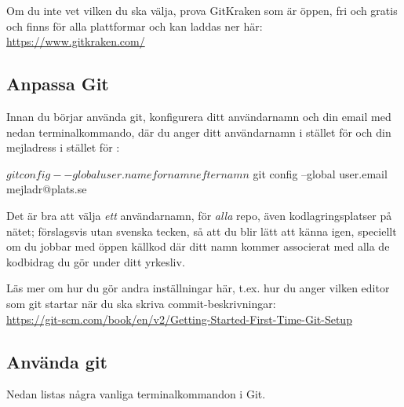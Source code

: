 Om du inte vet vilken du ska välja, prova GitKraken som är öppen, fri och gratis och finns för alla plattformar och kan laddas ner här: \\ \url{https://www.gitkraken.com/}


\subsection{Anpassa Git}

Innan du börjar använda git, konfigurera ditt användarnamn och din email med nedan terminalkommando, där du anger ditt användarnamn i stället för  och din mejladress i stället för :
\begin{REPLnonum}
$ git config --global user.name fornamnefternamn
$ git config --global user.email mejladr@plats.se
\end{REPLnonum}
Det är bra att välja \textit{ett} användarnamn, för \textit{alla} repo, även kodlagringsplatser på nätet; förslagsvis  utan svenska tecken,  så att du blir lätt att känna igen, speciellt om du jobbar med öppen källkod där ditt namn kommer associerat med alla de kodbidrag du gör under ditt yrkesliv.

Läs mer om hur du gör andra inställningar här, t.ex. hur du anger vilken editor som git startar när du ska skriva commit-beskrivningar: \\ \url{https://git-scm.com/book/en/v2/Getting-Started-First-Time-Git-Setup}
  
  
\subsection{Använda git}

Nedan listas några vanliga terminalkommandon i Git.


